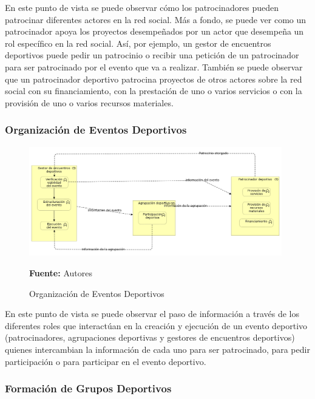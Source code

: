 En este punto de vista se puede observar cómo los patrocinadores pueden patrocinar diferentes actores en la red social. Más a fondo, se puede ver como un patrocinador apoya los proyectos desempeñados por un actor que desempeña un rol específico en la red social. Así, por ejemplo, un gestor de encuentros deportivos puede pedir un patrocinio o recibir una petición de un patrocinador para ser patrocinado por el evento que va a realizar. También se puede observar que un patrocinador deportivo patrocina proyectos de otros actores sobre la red social con su financiamiento, con la prestación de uno o varios servicios o con la provisión de uno o varios recursos materiales.

\subsubsection{Organización de Eventos Deportivos}

\begin{figure}[!htb]
  \begin{center}
    \includegraphics[width=11cm]{./imagenes/business_functions/organizacioneventosdeportivos.png}
    \caption{Organización de Eventos Deportivos}
    \label{fig:bf_organizacion_eventos_deportivos}
    \textbf{Fuente:}  Autores
  \end{center}
\end{figure}

En este punto de vista se puede observar el paso de información a través de los diferentes roles que interactúan en la creación y ejecución de un evento deportivo (patrocinadores, agrupaciones deportivas y gestores de encuentros deportivos) quienes intercambian la información de cada uno para ser patrocinado, para pedir participación o para participar en el evento deportivo.

\subsubsection{Formación de Grupos Deportivos}

